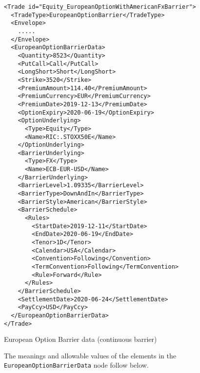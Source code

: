 \begin{listing}[H]
\begin{verbatim} 
<Trade id="Equity_EuropeanOptionWithAmericanFxBarrier">
  <TradeType>EuropeanOptionBarrier</TradeType>
  <Envelope>
    .....
  </Envelope>
  <EuropeanOptionBarrierData>
    <Quantity>8523</Quantity>
    <PutCall>Call</PutCall>
    <LongShort>Short</LongShort>
    <Strike>3520</Strike>
    <PremiumAmount>114.40</PremiumAmount>
    <PremiumCurrency>EUR</PremiumCurrency>
    <PremiumDate>2019-12-13</PremiumDate>
    <OptionExpiry>2020-06-19</OptionExpiry>
    <OptionUnderlying>
      <Type>Equity</Type>
      <Name>RIC:.STOXX50E</Name>
    </OptionUnderlying>
    <BarrierUnderlying>
      <Type>FX</Type>
      <Name>ECB-EUR-USD</Name>
    </BarrierUnderlying>
    <BarrierLevel>1.09335</BarrierLevel>
    <BarrierType>DownAndIn</BarrierType>
    <BarrierStyle>American</BarrierStyle>
    <BarrierSchedule>
      <Rules>
        <StartDate>2019-12-11</StartDate>
        <EndDate>2020-06-19</EndDate>
        <Tenor>1D</Tenor>
        <Calendar>USA</Calendar>
        <Convention>Following</Convention>
        <TermConvention>Following</TermConvention>
        <Rule>Forward</Rule>
      </Rules>
    </BarrierSchedule>
    <SettlementDate>2020-06-24</SettlementDate>
    <PayCcy>USD</PayCcy>
  </EuropeanOptionBarrierData>
</Trade>
\end{verbatim}
\caption{European Option Barrier data (continuous barrier)}
\label{lst:european_option_american_barrier}
\end{listing}

The meanings and allowable values of the elements in the \lstinline!EuropeanOptionBarrierData! node follow below.
 
